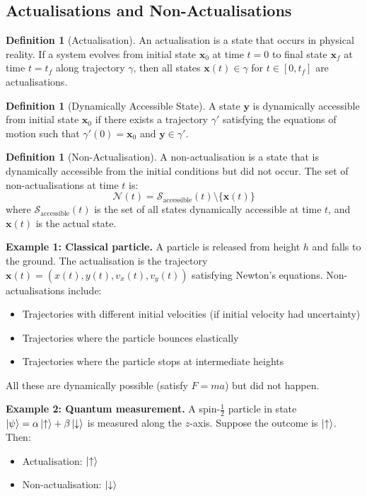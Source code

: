 \documentclass[twocolumn,10pt]{article}
\theoremstyle{definition}
\newtheorem{definition}[theorem]{Definition}
\theoremstyle{remark}
\begin{document}
\subsection{Actualisations and Non-Actualisations}

\begin{definition}[Actualisation]
An actualisation is a state that occurs in physical reality. If a system evolves from initial state $\mathbf{x}_0$ at time $t = 0$ to final state $\mathbf{x}_f$ at time $t = t_f$ along trajectory $\gamma$, then all states $\mathbf{x}(t) \in \gamma$ for $t \in [0, t_f]$ are actualisations.
\end{definition}

\begin{definition}[Dynamically Accessible State]
A state $\mathbf{y}$ is dynamically accessible from initial state $\mathbf{x}_0$ if there exists a trajectory $\gamma'$ satisfying the equations of motion such that $\gamma'(0) = \mathbf{x}_0$ and $\mathbf{y} \in \gamma'$.
\end{definition}

\begin{definition}[Non-Actualisation]
A non-actualisation is a state that is dynamically accessible from the initial conditions but did not occur. The set of non-actualisations at time $t$ is:
$$
\mathcal{N}(t) = \mathcal{S}_{\text{accessible}}(t) \setminus \{\mathbf{x}(t)\}
$$
where $\mathcal{S}_{\text{accessible}}(t)$ is the set of all states dynamically accessible at time $t$, and $\mathbf{x}(t)$ is the actual state.
\end{definition}

\textbf{Example 1: Classical particle.} A particle is released from height $h$ and falls to the ground. The actualisation is the trajectory $\mathbf{x}(t) = (x(t), y(t), v_x(t), v_y(t))$ satisfying Newton's equations. Non-actualisations include:
\begin{itemize}
\item Trajectories with different initial velocities (if initial velocity had uncertainty)
\item Trajectories where the particle bounces elastically
\item Trajectories where the particle stops at intermediate heights
\end{itemize}

All these are dynamically possible (satisfy $F = ma$) but did not happen.

\textbf{Example 2: Quantum measurement.} A spin-$\frac{1}{2}$ particle in state $\ket{\psi} = \alpha\ket{\uparrow} + \beta\ket{\downarrow}$ is measured along the $z$-axis. Suppose the outcome is $\ket{\uparrow}$. Then:
\begin{itemize}
\item Actualisation: $\ket{\uparrow}$
\item Non-actualisation: $\ket{\downarrow}$
\end{itemize}
\end{document}
